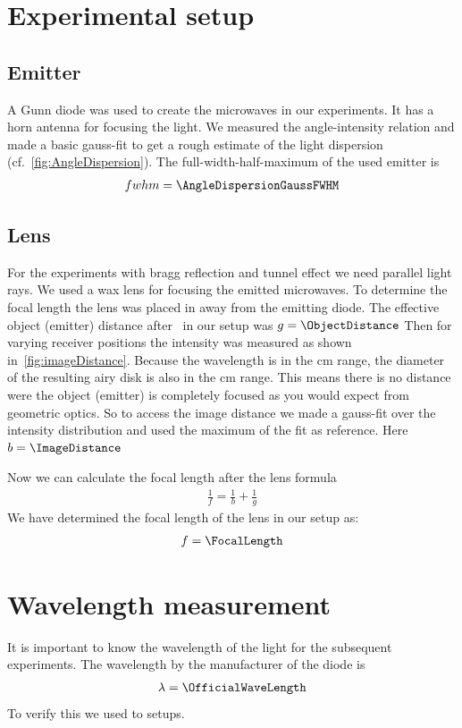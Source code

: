 \documentclass[a4paper,10pt,twocolumn]{article}
\begin{document}
    \section{Experimental setup}
    \subsection{Emitter}
    A Gunn diode was used to create the microwaves in our experiments. 
    It has a horn antenna for focusing the light.
    We measured the angle-intensity relation and made a basic gauss-fit to get a rough estimate of the light dispersion (cf.~\ref{fig:AngleDispersion}).
    The full-width-half-maximum of the used emitter is
    \begin{align*}
        fwhm = \AngleDispersionGaussFWHM
    \end{align*}



    \subsection{Lens}
    For the experiments with bragg reflection and tunnel effect we need parallel light rays.
    We used a wax lens for focusing the emitted microwaves.
    To determine the focal length the lens was placed in away from the emitting diode.
    The effective object (emitter) distance after~\cite{pasco} in our setup was $g = \ObjectDistance$
    Then for varying receiver positions the intensity was measured as shown in~\ref{fig:imageDistance}. 
    Because the wavelength is in the cm range, the diameter of the resulting airy disk is also in the cm range.
    This means there is no distance were the object (emitter) is completely focused as you would expect from geometric optics.
    So to access the image distance we made a gauss-fit over the intensity distribution and used the maximum of the fit as
    reference. 
    Here $b = \ImageDistance$

    Now we can calculate the focal length after the lens formula
    \begin{align*}
        \frac{1}{f} = \frac{1}{b} + \frac{1}{g}
    \end{align*}
    We have determined the focal length of the lens in our setup as:
    \begin{align*}
        f = \FocalLength
    \end{align*}
    \section{Wavelength measurement}
    It is important to know the wavelength of the light for the subsequent experiments.
    The wavelength by the manufacturer of the diode is
    \begin{align*}
        \lambda = \OfficialWaveLength
    \end{align*}
    To verify this we used to setups.
\end{document}
